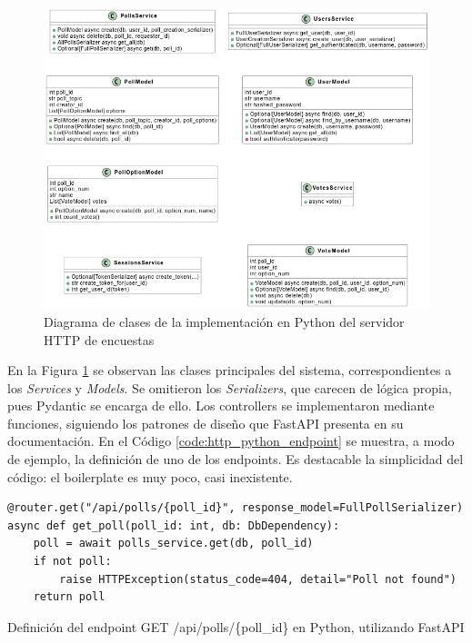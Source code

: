 \documentclass[11pt]{article}
\begin{document}
\begin{figure}
    \centering
    \includegraphics[width=\textwidth]{resources/http/python/class_diagram.png}
    \caption{Diagrama de clases de la implementación en Python del servidor HTTP de encuestas}
    \label{fig:http_python_class_diagram}
\end{figure}

En la Figura \ref{fig:http_python_class_diagram} se observan las clases principales del sistema, correspondientes a los \textit{Services} y \textit{Models}. Se omitieron los \textit{Serializers}, que carecen de lógica propia, pues Pydantic se encarga de ello. Los controllers se implementaron mediante funciones, siguiendo los patrones de diseño que FastAPI presenta en su documentación. En el Código \ref{code:http_python_endpoint} se muestra, a modo de ejemplo, la definición de uno de los endpoints. Es destacable la simplicidad del código: el boilerplate es muy poco, casi inexistente.

\begin{listing}
\begin{verbatim}
@router.get("/api/polls/{poll_id}", response_model=FullPollSerializer)
async def get_poll(poll_id: int, db: DbDependency):
    poll = await polls_service.get(db, poll_id)
    if not poll:
        raise HTTPException(status_code=404, detail="Poll not found")
    return poll
\end{verbatim}
\caption{Definición del endpoint GET /api/polls/\{poll\_id\} en Python, utilizando FastAPI}
\label{code:http_python_endpoint}
\end{listing}
\end{document}
